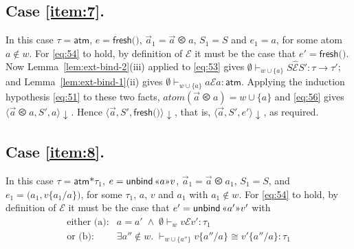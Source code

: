 \documentclass{LMCS}
\theoremstyle{plain}
\theoremstyle{definition}
\newcommand{\atm}[1][a]{#1}
\newcommand{\ATM}{\kw{atm}}
\newcommand{\atoms}{\mathit{atom}}
\newcommand{\BINDVAL}[2]{\mathopen{\text{\normalfont\guillemotleft}}#1
  \mathclose{\text{\normalfont\guillemotright}}#2}
\newcommand{\config}[3]{\langle#1, #2, #3\rangle}
\renewcommand{\conj}{\wedge}
\newcommand{\CR}[1]{\mathrel{\widehat{#1}}}
\newcommand{\ent}{\vdash}
\newcommand{\er}{\mathrel{\mathcal{E}}}
\renewcommand{\exp}[1][e]{#1}
\newcommand{\FRESH}{\kw{fresh}}
\newcommand{\FUNTY}{\mathbin{\rightarrow}}
\newcommand{\LP}{\mathopen{\kw{(}}}
\newcommand{\kw}[1]{\mathsf{#1}}
\newcommand{\ofty}{:}
\newcommand{\opeq}{\cong}
\newcommand{\ords}{\olessthan}\newcommand{\PAIR}[2]{\LP#1\mathbin{\kw{,}}#2\RP}
\newcommand{\PRODTY}{\mathbin{\kw{*}}}
\newcommand{\rename}[2]{\{#2/#1\}}
\newcommand{\RP}{\mathclose{\kw{)}}}
\newcommand{\s}[1][a]{\vec{#1}}
\newcommand{\stk}[1][S]{#1}
\newcommand{\terminates}[1][]{{\downarrow_{#1}}}
\newcommand{\ty}{\tau}
\newcommand{\UNBIND}{\kw{unbind}}
\newcommand{\UNITVAL}{\LP\RP}
\newcommand{\val}[1][v]{#1}
\newcommand{\w}[1][w]{#1}
\begin{document}
  \subsection*{Case \ref{item:7}.} In this case $\ty=\ATM$,
  $\exp=\FRESH\UNITVAL$, $\s_1=\s\ords\atm$, $\stk_1=\stk$ and
  $\exp_1=\atm$, for some atom $\atm\notin\w$. For \eqref{eq:54} to
  hold, by definition of ${\er}$ it must be the case that
  $\exp'=\FRESH\UNITVAL$.  Now Lemma~\ref{lem:ext-bind-2}(iii) applied
  to \eqref{eq:53} gives $\emptyset\ent_{\w\cup\{\atm\}}\stk\CR{\er}
  \stk'\ofty\ty\FUNTY\ty'$; and Lemma~\ref{lem:ext-bind-1}(ii) gives
  $\emptyset\ent_{\w\cup\{\atm\}} \atm\er \atm\ofty \ATM$.  Applying
  the induction hypothesis \eqref{eq:51} to these two facts,
  $\atoms(\s\ords\atm) = \w\cup\{\atm\}$ and \eqref{eq:56} gives
  $\config{\s\ords\atm}{\stk'}{\atm}\terminates$. Hence
  $\config{\s}{\stk'}{\FRESH\UNITVAL}\terminates$,
  that is, $\config{\s}{\stk'}{\exp'}\terminates$, as required.

  \subsection*{Case \ref{item:8}.} In this case $\ty=\ATM\PRODTY\ty_1$,
  $\exp=\UNBIND\,\BINDVAL{\atm}{\val}$, $\s_1=\s\ords \atm_1$,
  $\stk_1=\stk$, and
  $\exp_1=\PAIR{\atm_1}{\val\rename{\atm}{\atm_1}}$, for some $\ty_1$,
  $\atm$, $\val$ and $\atm_1$ with $\atm_1\notin\w$.  For
  \eqref{eq:54} to hold, by definition of $\er$ it must be the case
  that $e'=\UNBIND\,\BINDVAL{\atm'}{\val'}$ with
  \begin{equation}
   \label{eq:62}
    \begin{array}{rl}
      \text{either (a):} & \atm=\atm'\;\conj\;
      \emptyset\ent_{\w} \val\er \val'\ofty\ty_1\\
      \text{or (b):} & \exists \atm''\notin\w.\; 
      {}\ent_{\w\cup\{\atm''\}} \val\rename{\atm}{\atm''} \opeq 
      \val'\rename{\atm}{\atm''} \ofty\ty_1
    \end{array}
  \end{equation}
  
\end{document}
